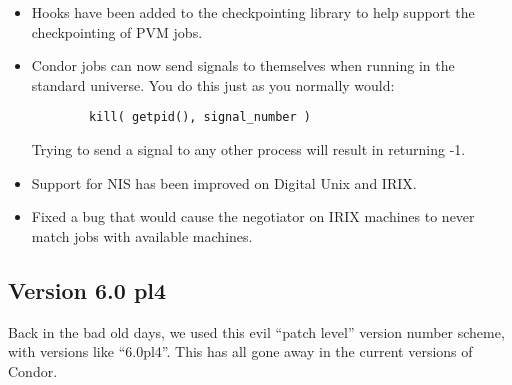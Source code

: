 \begin{itemize}
\item Hooks have been added to the checkpointing library to help
support the checkpointing of PVM jobs.

\item Condor jobs can now send signals to themselves when running in
the standard universe.
You do this just as you normally would:
\begin{verbatim}
        kill( getpid(), signal_number )
\end{verbatim}
Trying to send a signal to any other process will result in
 returning -1.

\item Support for NIS has been improved on Digital Unix and IRIX.

\item Fixed a bug that would cause the negotiator on IRIX machines to
never match jobs with available machines.  

\end{itemize}

\subsection{\label{sec:New-6-0-pl4}Version 6.0 pl4}

\Note Back in the bad old days, we used this evil ``patch level''
version number scheme, with versions like ``6.0pl4''.
This has all gone away in the current versions of Condor. 

